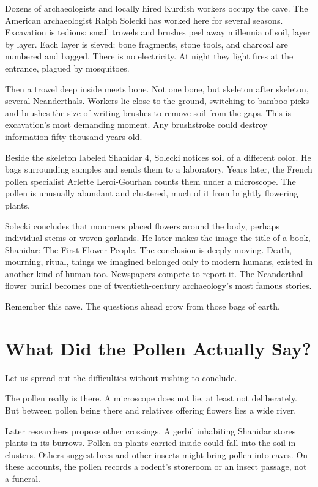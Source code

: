 Dozens of archaeologists and locally hired Kurdish workers occupy the cave. The American archaeologist Ralph Solecki has worked here for several seasons. Excavation is tedious: small trowels and brushes peel away millennia of soil, layer by layer. Each layer is sieved; bone fragments, stone tools, and charcoal are numbered and bagged. There is no electricity. At night they light fires at the entrance, plagued by mosquitoes.

Then a trowel deep inside meets bone. Not one bone, but skeleton after skeleton, several Neanderthals. Workers lie close to the ground, switching to bamboo picks and brushes the size of writing brushes to remove soil from the gaps. This is excavation's most demanding moment. Any brushstroke could destroy information fifty thousand years old.

Beside the skeleton labeled Shanidar 4, Solecki notices soil of a different color. He bags surrounding samples and sends them to a laboratory. Years later, the French pollen specialist Arlette Leroi-Gourhan counts them under a microscope. The pollen is unusually abundant and clustered, much of it from brightly flowering plants.

Solecki concludes that mourners placed flowers around the body, perhaps individual stems or woven garlands. He later makes the image the title of a book, Shanidar: The First Flower People. The conclusion is deeply moving. Death, mourning, ritual, things we imagined belonged only to modern humans, existed in another kind of human too. Newspapers compete to report it. The Neanderthal flower burial becomes one of twentieth-century archaeology's most famous stories.

Remember this cave. The questions ahead grow from those bags of earth.

\section{What Did the Pollen Actually Say?}
Let us spread out the difficulties without rushing to conclude.

The pollen really is there. A microscope does not lie, at least not deliberately. But between pollen being there and relatives offering flowers lies a wide river.

Later researchers propose other crossings. A gerbil inhabiting Shanidar stores plants in its burrows. Pollen on plants carried inside could fall into the soil in clusters. Others suggest bees and other insects might bring pollen into caves. On these accounts, the pollen records a rodent's storeroom or an insect passage, not a funeral.

